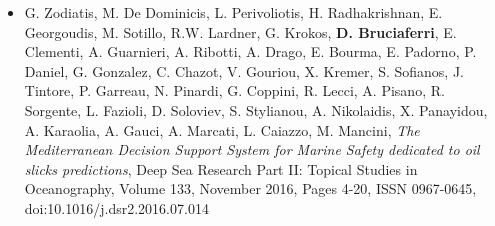\documentclass[a4paper, oneside, final]{scrartcl}
\begin{document}
\begin{itemize}
\item G. Zodiatis, M. De Dominicis, L. Perivoliotis, H. Radhakrishnan, E. Georgoudis, M. Sotillo, R.W. Lardner, G. Krokos, \textbf{D. Bruciaferri}, E. Clementi, A. Guarnieri, A. Ribotti, A. Drago, E. Bourma, E. Padorno, P. Daniel, G. Gonzalez, C. Chazot, V. Gouriou, X. Kremer, S. Sofianos, J. Tintore, P. Garreau, N. Pinardi, G. Coppini, R. Lecci, A. Pisano, R. Sorgente, L. Fazioli, D. Soloviev, S. Stylianou, A. Nikolaidis, X. Panayidou, A. Karaolia, A. Gauci, A. Marcati, L. Caiazzo, M. Mancini, \textit{The Mediterranean Decision Support System for Marine Safety dedicated to oil slicks predictions}, Deep Sea Research Part II: Topical Studies in Oceanography, Volume 133, November 2016, Pages 4-20, ISSN 0967-0645, doi:10.1016/j.dsr2.2016.07.014
\end{itemize}
\end{document}
